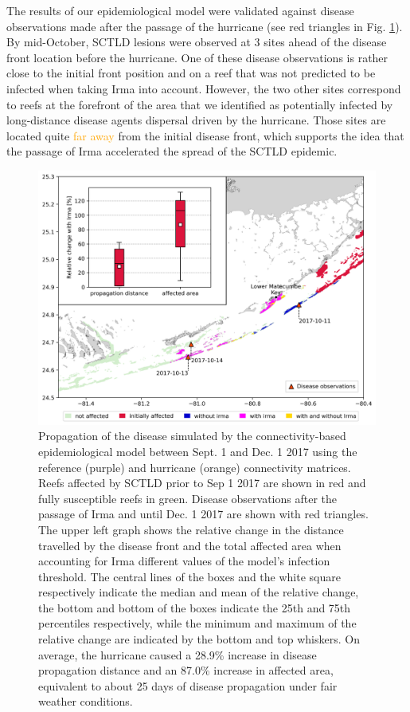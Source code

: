 \documentclass[fleqn,10pt]{wlscirep}
\newcommand{\modif}[1]{\textcolor{orange}{#1}}
\begin{document}
The results of our epidemiological model were validated against disease observations made after the passage of the hurricane (see red triangles in Fig. \ref{fig:propagation}). By mid-October, SCTLD lesions were observed at 3 sites ahead of the disease front location before the hurricane. One of these disease observations is rather close to the initial front position and on a reef that was not predicted to be infected when taking Irma into account. However, the two other sites correspond to reefs at the forefront of the area that we identified as potentially infected by long-distance disease agents dispersal driven by the hurricane. Those sites are located quite \modif{far away} from the initial disease front, which supports the idea that the passage of Irma accelerated the spread of the SCTLD epidemic.

\begin{figure}[tbp]
    \centering
    \includegraphics[width=.8\textwidth]{figures/propagation_boxplot_obs.png}
    \caption{
        Propagation of the disease simulated by the connectivity-based epidemiological model between Sept. 1 and Dec. 1 2017 using the reference (purple) and hurricane (orange) connectivity matrices. Reefs affected by SCTLD prior to Sep 1 2017 are shown in red and fully susceptible reefs in green. Disease observations after the passage of Irma and until Dec. 1 2017 are shown with red triangles. The upper left graph shows the relative change in the distance travelled by the disease front and the total affected area when accounting for Irma different values of the model's infection threshold. The central lines of the boxes and the white square respectively indicate the median and mean of the relative change, the bottom and bottom of the boxes indicate the 25th and 75th percentiles respectively, while the minimum and maximum of the relative change are indicated by the bottom and top whiskers. On average, the hurricane caused  a 28.9\% increase in disease propagation distance and an 87.0\% increase in affected area, equivalent to about 25 days of disease propagation under fair weather conditions.
    }\label{fig:propagation}
\end{figure}
\end{document}
